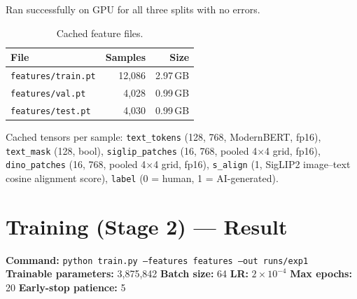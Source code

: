 \documentclass[11pt]{article}
\begin{document}
Ran successfully on GPU for all three splits with no errors.

\begin{table}[h]
\centering
\begin{tabular}{lrr}
\toprule
\textbf{File} & \textbf{Samples} & \textbf{Size} \\
\midrule
\texttt{features/train.pt} & 12{,}086 & 2.97\,GB \\
\texttt{features/val.pt}   & 4{,}028  & 0.99\,GB \\
\texttt{features/test.pt}  & 4{,}030  & 0.99\,GB \\
\bottomrule
\end{tabular}
\caption{Cached feature files.}
\end{table}

Cached tensors per sample: \texttt{text\_tokens} (128, 768, ModernBERT, fp16), \texttt{text\_mask} (128, bool), \texttt{siglip\_patches} (16, 768, pooled 4$\times$4 grid, fp16), \texttt{dino\_patches} (16, 768, pooled 4$\times$4 grid, fp16), \texttt{s\_align} (1, SigLIP2 image--text cosine alignment score), \texttt{label} (0 = human, 1 = AI-generated).

\section{Training (Stage 2) --- Result}

\textbf{Command:} \texttt{python train.py --features features --out runs/exp1}\\
\textbf{Trainable parameters:} 3{,}875{,}842 \quad \textbf{Batch size:} 64 \quad \textbf{LR:} $2\times10^{-4}$ \quad \textbf{Max epochs:} 20 \quad \textbf{Early-stop patience:} 5
\end{document}
